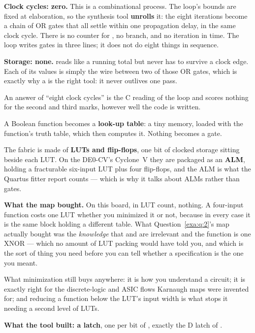 \textbf{Clock cycles: zero.} This is a combinational process. The loop's bounds are fixed at
elaboration, so the synthesis tool \textbf{unrolls} it: the eight iterations become a chain of OR
gates that all settle within one propagation delay, in the same clock cycle. There is no counter for
, no branch, and no iteration in time. The loop writes gates in three lines; it does not do
eight things in sequence. 

\textbf{Storage: none.}  reads like a running total but never has to survive a clock edge.
Each of its values is simply the wire between two of those OR gates, which is exactly why a
 is the right tool: it never outlives one pass. 

An answer of ``eight clock cycles'' is the C reading of the loop and scores nothing for the second
and third marks, however well the code is written.

A Boolean function becomes a \textbf{look-up table}: a tiny memory, loaded with the function's
truth table, which then computes it. Nothing becomes a gate.

The fabric is made of \textbf{LUTs and flip-flops}, one bit of clocked storage sitting beside each
LUT. On the DE0-CV's Cyclone~V they are packaged as an \textbf{ALM}, holding a fracturable six-input
LUT plus four flip-flops, and the ALM is what the Quartus fitter report counts --- which is why it
talks about ALMs rather than gates. 

\textbf{What the map bought.} On this board, in LUT count, nothing. A four-input function costs one
LUT whether you minimized it or not, because in every case it is the same block holding a different
table. What Question~\ref{exa:q:2}'s map actually bought was the \emph{knowledge} that  and
 are irrelevant and the function is one XNOR --- which no amount of LUT packing would have
told you, and which is the sort of thing you need before you can tell whether a specification is the
one you meant.

What minimization still buys anywhere: it is how you understand a circuit; it is exactly right for
the discrete-logic and ASIC flows Karnaugh maps were invented for; and reducing a function below the
LUT's input width is what stops it needing a second level of LUTs. 

\textbf{What the tool built: a latch}, one per bit of , exactly the D latch of
.

